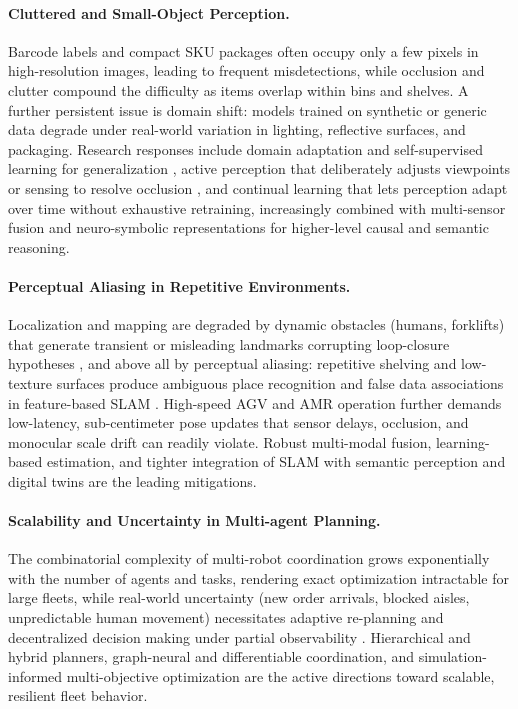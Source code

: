 \paragraph{Cluttered and Small-Object Perception.}
Barcode labels and compact SKU packages often occupy only a few pixels in high-resolution images, leading to frequent misdetections, while occlusion and clutter compound the difficulty as items overlap within bins and shelves. 
A further persistent issue is domain shift: models trained on synthetic or generic data degrade under real-world variation in lighting, reflective surfaces, and packaging. 
Research responses include domain adaptation and self-supervised learning for generalization \cite{Tzeng2017DomainAdversarial}, active perception that deliberately adjusts viewpoints or sensing to resolve occlusion \cite{Bajcsy2018ActivePerception}, and continual learning that lets perception adapt over time without exhaustive retraining, increasingly combined with multi-sensor fusion and neuro-symbolic representations for higher-level causal and semantic reasoning.

\paragraph{Perceptual Aliasing in Repetitive Environments.}
Localization and mapping are degraded by dynamic obstacles (humans, forklifts) that generate transient or misleading landmarks corrupting loop-closure hypotheses \cite{Cadena2016SLAMSurvey}, and above all by perceptual aliasing: repetitive shelving and low-texture surfaces produce ambiguous place recognition and false data associations in feature-based SLAM \cite{Campos2021ORBSLAM3,Labbe2019RTABMap}. 
High-speed AGV and AMR operation further demands low-latency, sub-centimeter pose updates that sensor delays, occlusion, and monocular scale drift can readily violate. Robust multi-modal fusion, learning-based estimation, and tighter integration of SLAM with semantic perception and digital twins are the leading mitigations.

\paragraph{Scalability and Uncertainty in Multi-agent Planning.}
The combinatorial complexity of multi-robot coordination grows exponentially with the number of agents and tasks, rendering exact optimization intractable for large fleets, while real-world uncertainty (new order arrivals, blocked aisles, unpredictable human movement) necessitates adaptive re-planning and decentralized decision making under partial observability \cite{Veloso2015CMUCoBot,Sartoretti2019PRIMAL}. 
Hierarchical and hybrid planners, graph-neural and differentiable coordination, and simulation-informed multi-objective optimization are the active directions toward scalable, resilient fleet behavior.

